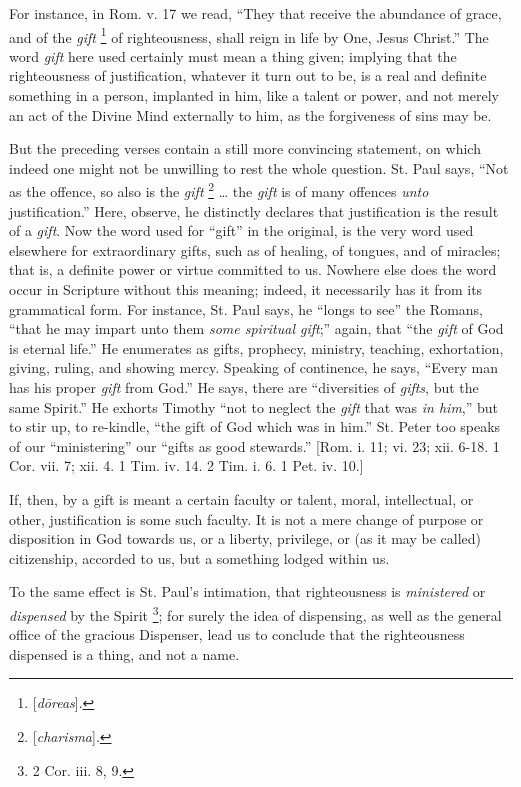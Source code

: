 For instance, in Rom. v. 17 we read, ``They that receive the
abundance of grace, and of the \emph{gift} \footnote{[\emph{d\={o}reas}].} of righteousness, shall reign in life by One, Jesus
Christ.'' The word \emph{gift} here used certainly must mean a
thing given; implying that the righteousness of justification,
whatever it turn out to be, is a real and definite something in a
person, implanted in him, like a talent or power, and not merely an
act of the Divine Mind externally to him, as the forgiveness of sins
may be.

But the preceding verses contain a still more convincing statement,
on which indeed one might not be unwilling to rest the whole question.
St. Paul says, ``Not as the offence, so also is the \emph{gift} \footnote{[\emph{charisma}].} … the \emph{gift} is of many offences \emph{unto}
justification.'' Here, observe, he distinctly declares that
justification is the result of a \emph{gift}. Now the word used for
``gift'' in the original, is the very word used elsewhere for
extraordinary gifts, such as of healing, of tongues, and of miracles;
that is, a definite power or virtue committed to us. Nowhere else does the word occur in Scripture without this meaning; indeed, it
necessarily has it from its grammatical form. For instance, St. Paul
says, he ``longs to see'' the Romans, ``that he may impart
unto them \emph{some spiritual gift};'' again, that ``the \emph{gift}
of God is eternal life.'' He enumerates as gifts, prophecy,
ministry, teaching, exhortation, giving, ruling, and showing mercy.
Speaking of continence, he says, ``Every man has his proper \emph{gift}
from God.'' He says, there are ``diversities of \emph{gifts},
but the same Spirit.'' He exhorts Timothy ``not to neglect the
\emph{gift} that was \emph{in him},'' but to stir up, to
re-kindle, ``the gift of God which was in him.'' St. Peter too
speaks of our ``ministering'' our ``gifts as good
stewards.'' [Rom. i. 11; vi. 23; xii. 6-18. 1 Cor. vii. 7; xii. 4.
1 Tim. iv. 14. 2 Tim. i. 6. 1 Pet. iv. 10.]

If, then, by a gift is meant a certain faculty or talent, moral,
intellectual, or other, justification is some such faculty. It is not
a mere change of purpose or disposition in God towards us, or a
liberty, privilege, or (as it may be called) citizenship, accorded to
us, but a something lodged within us.

To the same effect is St. Paul's intimation, that righteousness is \emph{ministered}
or \emph{dispensed} by the Spirit \footnote{2 Cor. iii. 8,
9.}; for surely the idea of dispensing, as well as the general
office of the gracious Dispenser, lead us to conclude that the
righteousness dispensed is a thing, and not a name.

